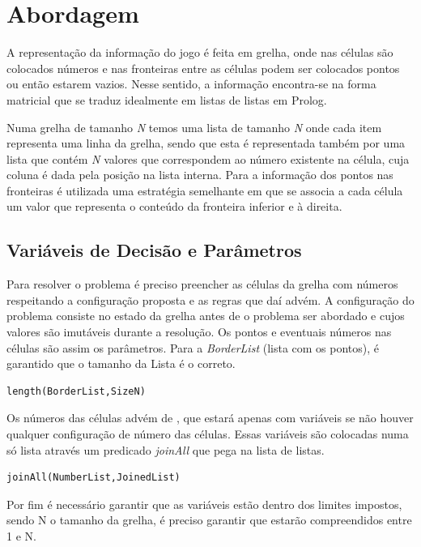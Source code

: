 \documentclass[runningheads,a4paper]{llncs}
\begin{document}
\section{Abordagem}

A representação da informação do jogo é feita em grelha, onde nas células são colocados números e nas fronteiras entre as células podem ser colocados pontos ou então estarem vazios.
Nesse sentido, a informação encontra-se na forma matricial que se traduz idealmente em listas de listas em Prolog.

Numa grelha de tamanho \textit{N} temos uma lista de tamanho \textit{N} onde cada item representa uma linha da grelha, sendo que esta é representada também por uma lista que contém \textit{N} valores que correspondem ao número existente na célula, cuja coluna é dada pela posição na lista interna.
Para a informação dos pontos nas fronteiras é utilizada uma estratégia semelhante em que se associa a cada célula um valor que representa o conteúdo da fronteira inferior e à direita.

\subsection{Variáveis de Decisão e Parâmetros}

Para resolver o problema é preciso preencher as células da grelha com números respeitando a configuração proposta e as regras que daí advém.
A configuração do problema consiste no estado da grelha antes de o problema ser abordado e cujos valores são imutáveis durante a resolução. Os pontos e eventuais números nas células são assim os parâmetros.
Para a \textit{BorderList} (lista com os pontos), é garantido que o tamanho da Lista é o correto.

\begin{verbatim}length(BorderList,SizeN)\end{verbatim}

Os números das células advém de , que estará apenas com variáveis se não houver qualquer configuração de número das células. Essas variáveis são colocadas numa só lista através um predicado \textit{joinAll} que pega na lista de listas. 
\begin{verbatim}joinAll(NumberList,JoinedList)\end{verbatim} 
Por fim é necessário garantir que as variáveis estão dentro dos limites impostos, sendo N o tamanho da grelha, é preciso garantir que estarão compreendidos entre 1 e N.
\end{document}
